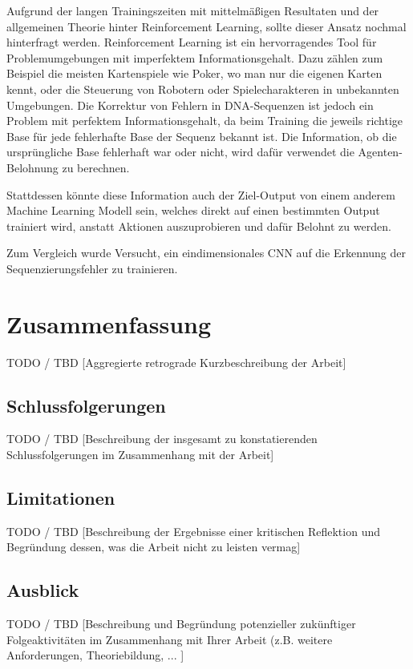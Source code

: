 \documentclass[oneside,bibliography=totocnumbered,BCOR=5mm]{scrbook}%
\theoremstyle{definition}
\theoremstyle{definition}
\theoremstyle{definition}
\theoremstyle{definition}
\theoremstyle{definition}
\theoremstyle{definition}
\begin{document}
Aufgrund der langen Trainingszeiten mit mittelmäßigen Resultaten und der allgemeinen Theorie hinter Reinforcement Learning,
sollte dieser Ansatz nochmal hinterfragt werden. 
Reinforcement Learning ist ein hervorragendes Tool für Problemumgebungen mit imperfektem Informationsgehalt.
Dazu zählen zum Beispiel die meisten Kartenspiele wie Poker, wo man nur die eigenen Karten kennt, oder die 
Steuerung von Robotern oder Spielecharakteren in unbekannten Umgebungen.
Die Korrektur von Fehlern in DNA-Sequenzen ist jedoch ein Problem mit perfektem Informationsgehalt, da beim Training
die jeweils richtige Base für jede fehlerhafte Base der Sequenz bekannt ist.
Die Information, ob die ursprüngliche Base fehlerhaft war oder nicht, wird dafür verwendet die Agenten-Belohnung 
zu berechnen.

Stattdessen könnte diese Information auch der Ziel-Output von einem anderem Machine Learning Modell sein, welches direkt
auf einen bestimmten Output trainiert wird, anstatt Aktionen auszuprobieren und dafür Belohnt zu werden.
 
Zum Vergleich wurde Versucht, ein eindimensionales CNN auf die Erkennung der Sequenzierungsfehler zu trainieren.


\chapter{Zusammenfassung}
TODO / TBD
[Aggregierte retrograde Kurzbeschreibung der Arbeit]
\section{Schlussfolgerungen}
TODO / TBD
[Beschreibung der insgesamt zu konstatierenden Schlussfolgerungen im Zusammenhang mit der Arbeit]
\section{Limitationen}
TODO / TBD
[Beschreibung der Ergebnisse einer kritischen Reflektion und Begründung dessen, was die Arbeit nicht zu leisten vermag]
\section{Ausblick}
TODO / TBD
[Beschreibung und Begründung potenzieller zukünftiger Folgeaktivitäten im Zusammenhang mit Ihrer Arbeit (z.B. weitere Anforderungen, Theoriebildung, ... ]
\end{document}
